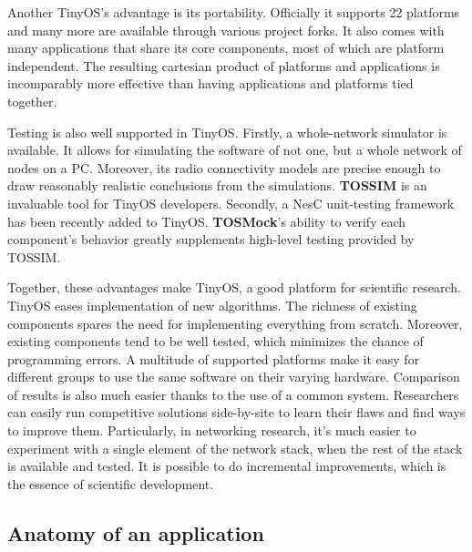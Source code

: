 Another TinyOS's advantage is its portability. Officially it supports 22 platforms and many more are available through various project forks. It also comes with many applications that share its core components, most of which are platform independent. The resulting cartesian product of platforms and applications is incomparably more effective than having applications and platforms tied together.

Testing is also well supported in TinyOS. Firstly, a whole-network simulator \cite{TOSSIM} is available. It allows for simulating the software of not one, but a whole network of nodes on a PC. Moreover, its radio connectivity models are precise enough to draw reasonably realistic conclusions from the simulations. {\bf TOSSIM} is an invaluable tool for TinyOS developers. Secondly, a NesC unit-testing framework \cite{TOSMock} has been recently added to TinyOS. {\bf TOSMock}'s ability to verify each component's behavior greatly supplements high-level testing provided by TOSSIM.

Together, these advantages make TinyOS, a good platform for scientific research. TinyOS eases implementation of new algorithms. The richness of existing components spares the need for implementing everything from scratch.  Moreover, existing components tend to be well tested, which minimizes the chance of programming errors.  A multitude of supported platforms make it easy for different groups to use the same software on their varying hardware.  Comparison of results is also much easier thanks to the use of a common system.  Researchers can easily run competitive solutions side-by-site to learn their flaws and find ways to improve them.  Particularly, in networking research, it's much easier to experiment with a single element of the network stack, when the rest of the stack is available and tested. It is possible to do incremental improvements, which is the essence of scientific development.

\subsection{Anatomy of an application}

